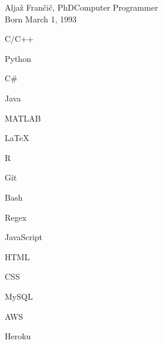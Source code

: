\documentclass{article}
\begin{document}
\begin{cv}[avatar]{Aljaž Frančič, PhD}{Computer Programmer\\\small{Born March 1, 1993}}

\begin{cvitem}
    C/C++
\end{cvitem}

\begin{cvitem}
    Python
\end{cvitem}

\begin{cvitem}
    C\#
\end{cvitem}

\begin{cvitem}
    Java
\end{cvitem}

\begin{cvitem}
    MATLAB
\end{cvitem}

\begin{cvitem}
    LaTeX
\end{cvitem}

\begin{cvitem}
    R
\end{cvitem}

\begin{cvitem}
    Git
\end{cvitem}

\begin{cvitem}
    Bash
\end{cvitem}

\begin{cvitem}
    Regex
\end{cvitem}

\begin{cvitem}
    JavaScript
\end{cvitem}

\begin{cvitem}
    HTML
\end{cvitem}

\begin{cvitem}
    CSS
\end{cvitem}

\begin{cvitem}
    MySQL
\end{cvitem}

\begin{cvitem}
    AWS
\end{cvitem}

\begin{cvitem}
    Heroku
\end{cvitem}


\end{cv}
\end{document}
